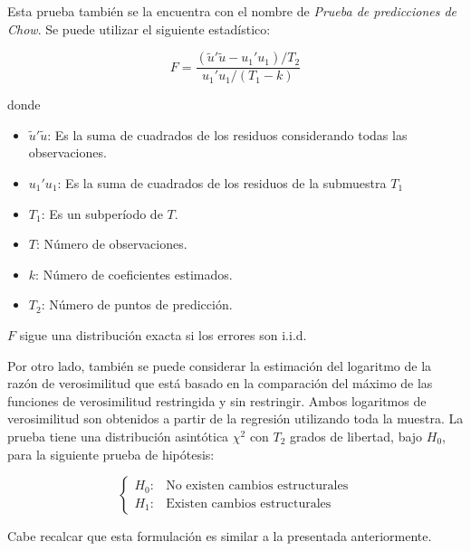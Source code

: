 \begin{observacion}
Esta prueba tambi\'{e}n se la encuentra con el nombre de \emph{Prueba de predicciones de Chow}. Se puede utilizar el siguiente estad\'{i}stico:

\[
F=\frac{\left( \tilde{u}'\tilde{u}-u_{1}'u_{1} 
\right)/T_{2}}{u_{1}'u_{1}/(T_{1}-k)}
\]

donde
\begin{itemize}
      \item $\tilde{u}'\tilde{u}$: Es la suma de cuadrados de los residuos considerando todas las observaciones.
      \item $u_{1}'u_{1}$: Es la suma de cuadrados de los residuos de la submuestra $T_{1}$
      \item $T_{1}$: Es un subper\'{i}odo de $T$.
      \item $T$: N\'{u}mero de observaciones.
      \item $k$: N\'{u}mero de coeficientes estimados.
      \item $T_{2}$: N\'{u}mero de puntos de predicci\'{o}n.
\end{itemize}

$F$ sigue una distribuci\'{o}n exacta si los errores son i.i.d.\newline

Por otro lado, tambi\'{e}n se puede considerar la estimaci\'{o}n del logaritmo de la raz\'{o}n de verosimilitud que est\'{a} basado en la comparaci\'{o}n del m\'{a}ximo de las funciones de verosimilitud restringida y sin restringir. Ambos logaritmos de verosimilitud son obtenidos a partir de la regresi\'{o}n utilizando toda la muestra. La prueba tiene una distribuci\'{o}n asint\'{o}tica $\chi^{2}$ con $T_{2}$ grados de libertad, bajo $H_{0}$, para la siguiente prueba de hip\'{o}tesis:

\[
\begin{cases}
 H_{0}:&\text{No  existen  cambios  estructurales}\\
 H_{1}:&\text{Existen  cambios  estructurales}
\end{cases}
\]

Cabe recalcar que esta formulaci\'{o}n es similar a la presentada anteriormente.
\end{observacion}


